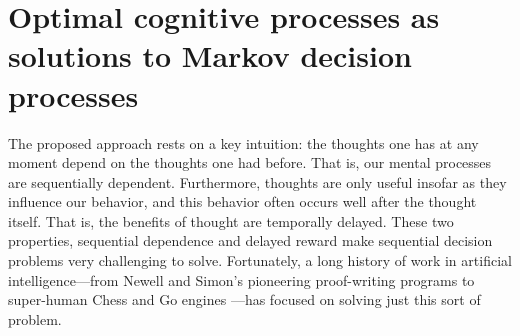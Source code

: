 


\section{Optimal cognitive processes as solutions to Markov decision processes}

The proposed approach rests on a key intuition: the thoughts one has at any moment depend on the thoughts one had before. That is, our mental processes are sequentially dependent. Furthermore, thoughts are only useful insofar as they influence our behavior, and this behavior often occurs well after the thought itself. That is, the benefits of thought are temporally delayed. These two properties, sequential dependence and delayed reward make sequential decision problems very challenging to solve. Fortunately, a long history of work in artificial intelligence---from Newell and Simon's pioneering proof-writing programs \citep{newell1956logic} to super-human Chess and Go engines \citep{silver2017mastering}---has focused on solving just this sort of problem.

